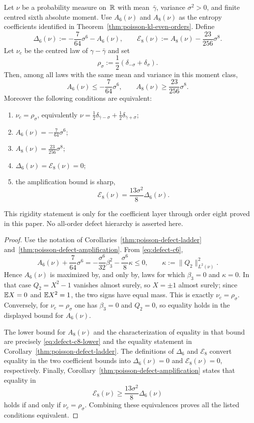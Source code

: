 \begin{corollary}%
\label{cor:poisson-two-point-defect-rigidity}
Let $\nu$ be a probability measure on~$\mathbb{R}$ with mean~$\bar{\gamma}$,
variance $\sigma^2>0$, and finite centred sixth absolute moment.  Use
\(A_6(\nu)\) and \(A_8(\nu)\) as the entropy coefficients identified in
Theorem~\ref{thm:poisson-kl-even-orders}.
Define
\[
\Delta_6(\nu)
:=-\frac{7}{64}\sigma^6-A_6(\nu),
\qquad
\mathcal E_8(\nu)
:=A_8(\nu)-\frac{23}{256}\sigma^8.
\]
Let $\nu_c$ be the centred law of $\gamma-\bar{\gamma}$ and set
\[
\rho_\sigma:=\frac12(\delta_{-\sigma}+\delta_\sigma).
\]
Then, among all laws with the same mean and variance in this moment class,
\[
A_6(\nu)\le -\frac{7}{64}\sigma^6,
\qquad
A_8(\nu)\ge \frac{23}{256}\sigma^8.
\]
Moreover the following conditions are equivalent:
\begin{enumerate}[label=\textup{(\roman*)},leftmargin=*]
\item $\nu_c=\rho_\sigma$, equivalently
$\nu=\frac12\delta_{\bar{\gamma}-\sigma}
+\frac12\delta_{\bar{\gamma}+\sigma}$;
\item \(A_6(\nu)=-\frac{7}{64}\sigma^6\);
\item \(A_8(\nu)=\frac{23}{256}\sigma^8\);
\item \(\Delta_6(\nu)=
\mathcal E_8(\nu)=0\);
\item the amplification bound is sharp,
\[
\mathcal E_8(\nu)
=\frac{13\sigma^2}{8}\Delta_6(\nu).
\]
\end{enumerate}
\end{corollary}

\begin{remark}
This rigidity statement is only for the coefficient layer through order eight proved in
this paper.  No all-order defect hierarchy is asserted here.
\end{remark}

\begin{proof}
Use the notation of Corollaries~\ref{thm:poisson-defect-ladder}
and~\ref{thm:poisson-defect-amplification}.  From
\eqref{eq:defect-c6},
\[
A_6(\nu)+\frac{7}{64}\sigma^6
=-\frac{\sigma^6}{32}\beta_3^2-\frac{\sigma^6}{8}\kappa
\le0,
\qquad
\kappa:=\|Q_2\|_{L^2(\nu)}^2.
\]
Hence \(A_6(\nu)\) is maximized by, and only by, laws for which
$\beta_3=0$ and $\kappa=0$.  In that case
$Q_2=X^2-1$ vanishes almost surely, so $X=\pm1$ almost surely; since
$\mathbb{E} X=0$ and $\mathbb{E} X^2=1$, the two signs have equal mass.  This is exactly
$\nu_c=\rho_\sigma$.  Conversely, for $\nu_c=\rho_\sigma$ one has
$\beta_3=0$ and $Q_2=0$, so equality holds in the displayed bound for
\(A_6(\nu)\).

The lower bound for \(A_8(\nu)\) and the characterization of equality
in that bound are precisely \eqref{eq:defect-c8-lower} and the equality
statement in Corollary~\ref{thm:poisson-defect-ladder}.  The definitions of
\(\Delta_6\) and \(\mathcal E_8\) convert equality
in the two coefficient bounds into
\(\Delta_6(\nu)=0\) and
\(\mathcal E_8(\nu)=0\), respectively.  Finally,
Corollary~\ref{thm:poisson-defect-amplification} states that equality in
\[
\mathcal E_8(\nu)\ge
\frac{13\sigma^2}{8}\Delta_6(\nu)
\]
holds if and only if $\nu_c=\rho_\sigma$.  Combining these equivalences
proves all the listed conditions equivalent.
\end{proof}
